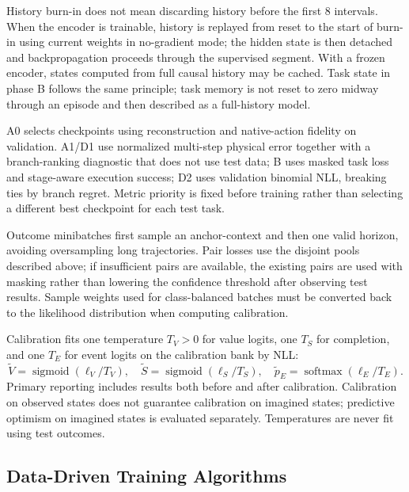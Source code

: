 \documentclass[
  10pt,
]{article}
\begin{document}
History burn-in does not mean discarding history before the first 8 intervals. When the encoder is trainable, history is replayed from reset to the start of burn-in using current weights in no-gradient mode; the hidden state is then detached and backpropagation proceeds through the supervised segment. With a frozen encoder, states computed from full causal history may be cached. Task state in phase B follows the same principle; task memory is not reset to zero midway through an episode and then described as a full-history model.

A0 selects checkpoints using reconstruction and native-action fidelity on validation. A1/D1 use normalized multi-step physical error together with a branch-ranking diagnostic that does not use test data; B uses masked task loss and stage-aware execution success; D2 uses validation binomial NLL, breaking ties by branch regret. Metric priority is fixed before training rather than selecting a different best checkpoint for each test task.

Outcome minibatches first sample an anchor-context and then one valid horizon, avoiding oversampling long trajectories. Pair losses use the disjoint pools described above; if insufficient pairs are available, the existing pairs are used with masking rather than lowering the confidence threshold after observing test results. Sample weights used for class-balanced batches must be converted back to the likelihood distribution when computing calibration.

Calibration fits one temperature \(T_V>0\) for value logits, one \(T_S\) for completion, and one \(T_E\) for event logits on the calibration bank by NLL:
\begin{equation}\label{eq:calibration}
\widetilde V=\operatorname{sigmoid}(\ell_V/T_V),\quad
\widetilde S=\operatorname{sigmoid}(\ell_S/T_S),\quad
\widetilde p_E=\operatorname{softmax}(\ell_E/T_E).
\end{equation}
Primary reporting includes results both before and after calibration. Calibration on observed states does not guarantee calibration on imagined states; predictive optimism on imagined states is evaluated separately. Temperatures are never fit using test outcomes.

\hypertarget{thuux1eadt-touxe1n-training-theo-dux1eef-liux1ec7u}{%
\subsection{Data-Driven Training Algorithms}\label{thuux1eadt-touxe1n-training-theo-dux1eef-liux1ec7u}}
\end{document}
